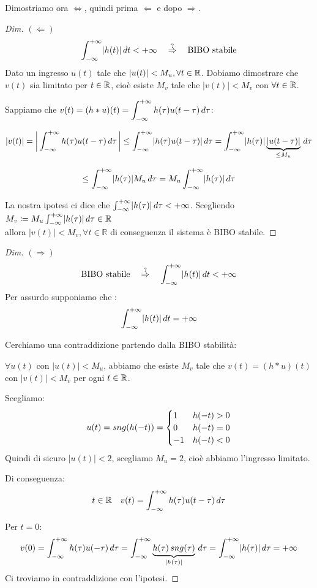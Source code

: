 	Dimostriamo ora $\Leftrightarrow $, quindi prima $\Leftarrow $ e dopo $ \Rightarrow$.
	\begin{proof}[Dim]
		\emph{$(\Leftarrow)$}
		\[
			\int_{-\infty}^{+\infty}\lvert h(t) \rvert \, d t < +\infty \quad \overset{?}{\Rightarrow} \quad \text{BIBO stabile}
		\]	
		Dato un ingresso $u(t) $ tale che $ \lvert u(t) \rvert < M_u , \forall t \in \mathbb{R}$. Dobiamo dimostrare che $ v(t) $ sia limitato per $ t \in \mathbb{R} $, cioè esiste $ M_v $ tale che $| v(t) | < M_v $ con $ \forall t \in \mathbb{R} $. 
		
		Sappiamo che 
		$\displaystyle
			v(t)
			=(h*u)(t) 
			= \int_{-\infty}^{+\infty}h(\tau)u(t-\tau)\, d\tau 
		$:
		
		\[
			\lvert v(t)\rvert 
			= \bigg\lvert \int_{-\infty}^{+\infty}h(\tau)u(t-\tau)\, d\tau \,  \bigg\rvert
			\le \int_{-\infty}^{+\infty} \rvert h(\tau)u(t-\tau) \lvert\, d\tau
			= \int_{-\infty}^{+\infty} \rvert h(\tau) \lvert \, \underbrace{\rvert u(t-\tau) \lvert}_{\le M_u} \, d\tau
		\]
		
		\[
			\le \int_{-\infty}^{+\infty} \rvert h(\tau)\lvert M_u \, d\tau 
			= M_u \int_{-\infty}^{+\infty} \rvert h(\tau)\lvert  \, d\tau
		\]
		
		La nostra ipotesi ci dice che $ \int_{-\infty}^{+\infty} \rvert h(\tau)\lvert  \, d\tau < + \infty$.
		Scegliendo $ M_v \coloneqq M_u \int_{-\infty}^{+\infty} \rvert h(\tau)\lvert\, d\tau \in \mathbb{R}$\\
		allora $ \lvert v(t) \rvert < M_v, \forall t \in \mathbb{R}$
		di conseguenza il sistema è BIBO stabile.
	\end{proof}
	
	\begin{proof}[Dim]
		\emph{$(\Rightarrow)$}
		\[
			\text{BIBO stabile} \quad \overset{?}{\Rightarrow} \quad \int_{-\infty}^{+\infty}\lvert h(t) \rvert \, d t < +\infty
		\]
		Per assurdo supponiamo che :
		\[
			\int_{-\infty}^{+\infty}\lvert h(t) \rvert \, d t = +\infty
		\]
		
		Cerchiamo  una contraddizione partendo dalla BIBO stabilità:
		
		$\forall u(t)$ con $ |u(t)| <M_u $, abbiamo che esiste $ M_v$ tale che $ v(t) = (h*u)(t)$ con $ \lvert v(t) \rvert < M_v $ per ogni $ t \in \mathbb{R}$.
		
		Scegliamo:
		\[
			u(t) = sng(h(-t)) = \begin{cases}
				1 &h(-t)>0\\
				0 &h(-t)=0\\
				-1 &h(-t)<0\\
			\end{cases}
		\]
		Quindi di sicuro $\lvert u(t)\rvert <2$, scegliamo $ M_u = 2$, cioè abbiamo l'ingresso limitato.
		
		Di conseguenza:
		\[
			t \in \mathbb{R} \quad v(t) = \int_{-\infty}^{+\infty}h(\tau)u(t-\tau)\, d\tau 
		\]
		
		Per $t=0$:
		\[
			v(0) = \int_{-\infty}^{+\infty}h(\tau)u(-\tau)\, d\tau 
			= \int_{-\infty}^{+\infty}\underbrace{h(\tau)\, sng(\tau)}_{\lvert h(\tau)\rvert}\, d\tau
			= \int_{-\infty}^{+\infty}\lvert h(\tau) \rvert \, d\tau = +\infty
		\]
		Ci troviamo in contraddizione con l'ipotesi.
	\end{proof}
	
